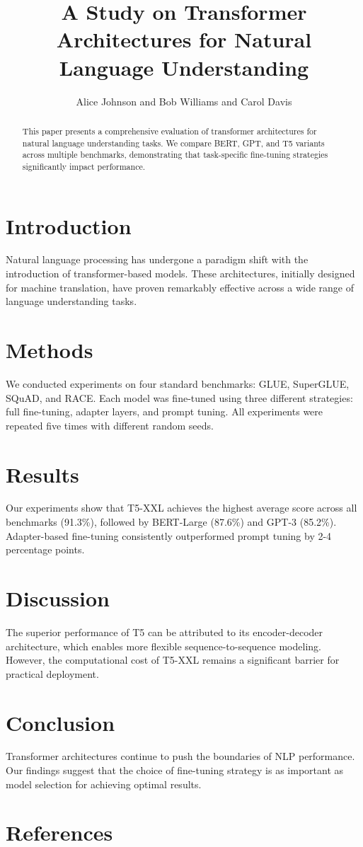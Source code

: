 \documentclass{article}
\title{A Study on Transformer Architectures for Natural Language Understanding}
\author{Alice Johnson and Bob Williams and Carol Davis}
\begin{document}
\maketitle

\begin{abstract}
This paper presents a comprehensive evaluation of transformer architectures for natural language understanding tasks. We compare BERT, GPT, and T5 variants across multiple benchmarks, demonstrating that task-specific fine-tuning strategies significantly impact performance.
\end{abstract}

\section{Introduction}
Natural language processing has undergone a paradigm shift with the introduction of transformer-based models. These architectures, initially designed for machine translation, have proven remarkably effective across a wide range of language understanding tasks.

\section{Methods}
We conducted experiments on four standard benchmarks: GLUE, SuperGLUE, SQuAD, and RACE. Each model was fine-tuned using three different strategies: full fine-tuning, adapter layers, and prompt tuning. All experiments were repeated five times with different random seeds.

\section{Results}
Our experiments show that T5-XXL achieves the highest average score across all benchmarks (91.3\%), followed by BERT-Large (87.6\%) and GPT-3 (85.2\%). Adapter-based fine-tuning consistently outperformed prompt tuning by 2-4 percentage points.

\section{Discussion}
The superior performance of T5 can be attributed to its encoder-decoder architecture, which enables more flexible sequence-to-sequence modeling. However, the computational cost of T5-XXL remains a significant barrier for practical deployment.

\section{Conclusion}
Transformer architectures continue to push the boundaries of NLP performance. Our findings suggest that the choice of fine-tuning strategy is as important as model selection for achieving optimal results.

\section{References}


\end{document}
